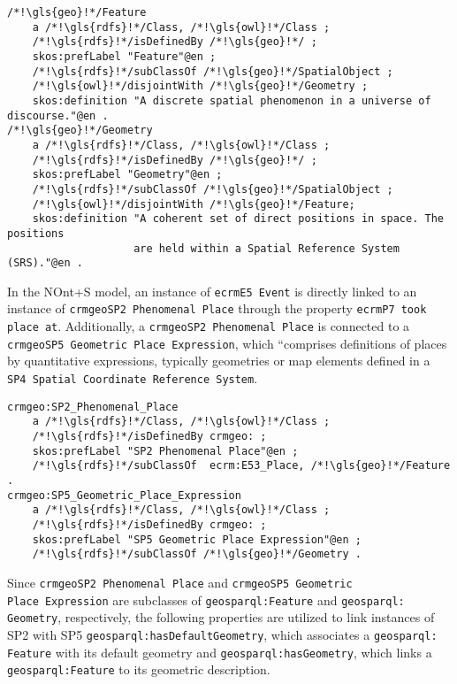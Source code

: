 \begin{lstlisting}[caption=Definition of classes and property in NOnt+S, label={lst:nont-implementation-2}]
/*!\gls{geo}!*/Feature
    a /*!\gls{rdfs}!*/Class, /*!\gls{owl}!*/Class ;
    /*!\gls{rdfs}!*/isDefinedBy /*!\gls{geo}!*/ ;
    skos:prefLabel "Feature"@en ;
    /*!\gls{rdfs}!*/subClassOf /*!\gls{geo}!*/SpatialObject ;
    /*!\gls{owl}!*/disjointWith /*!\gls{geo}!*/Geometry ;
    skos:definition "A discrete spatial phenomenon in a universe of discourse."@en .
/*!\gls{geo}!*/Geometry
    a /*!\gls{rdfs}!*/Class, /*!\gls{owl}!*/Class ;
    /*!\gls{rdfs}!*/isDefinedBy /*!\gls{geo}!*/ ;
    skos:prefLabel "Geometry"@en ;
    /*!\gls{rdfs}!*/subClassOf /*!\gls{geo}!*/SpatialObject ;
    /*!\gls{owl}!*/disjointWith /*!\gls{geo}!*/Feature;
    skos:definition "A coherent set of direct positions in space. The positions
                    are held within a Spatial Reference System (SRS)."@en .
\end{lstlisting}

In the NOnt+S model, an instance of \texttt{\gls{ecrm}E5 Event} is directly linked to an instance of \texttt{\gls{crmgeo}SP2 Phenomenal Place} through the property \texttt{\gls{ecrm}P7 took place at}. Additionally, a \texttt{\gls{crmgeo}SP2 Phenomenal Place} is connected to a \texttt{\gls{crmgeo}SP5 Geometric Place Expression}, which ``comprises definitions of places by quantitative expressions, typically geometries or map elements defined in a \texttt{SP4 Spatial Coordinate Reference System}.

\begin{lstlisting}[caption=Definition of classes and property in NOnt+S, label={lst:nont-implementation-3}]
crmgeo:SP2_Phenomenal_Place
    a /*!\gls{rdfs}!*/Class, /*!\gls{owl}!*/Class ;
    /*!\gls{rdfs}!*/isDefinedBy crmgeo: ;
    skos:prefLabel "SP2 Phenomenal Place"@en ;
    /*!\gls{rdfs}!*/subClassOf  ecrm:E53_Place, /*!\gls{geo}!*/Feature .
crmgeo:SP5_Geometric_Place_Expression
    a /*!\gls{rdfs}!*/Class, /*!\gls{owl}!*/Class ;
    /*!\gls{rdfs}!*/isDefinedBy crmgeo: ;
    skos:prefLabel "SP5 Geometric Place Expression"@en ;
    /*!\gls{rdfs}!*/subClassOf /*!\gls{geo}!*/Geometry .
\end{lstlisting}

Since \texttt{\gls{crmgeo}SP2 Phenomenal Place} and \texttt{\gls{crmgeo}SP5 Geometric \\Place Expression} are subclasses of \texttt{geosparql:Feature} and \texttt{geosparql:\\Geometry}, respectively, the following properties are utilized to link instances of SP2 with SP5 \texttt{geosparql:hasDefaultGeometry}, which associates a \texttt{geosparql:\\Feature} with its default geometry and \texttt{geosparql:hasGeometry}, which links a \texttt{geosparql:Feature} to its geometric description.

